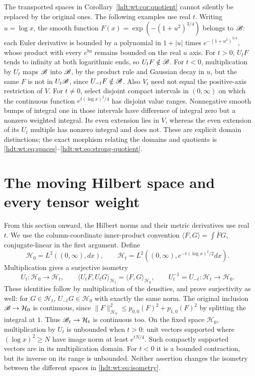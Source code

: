 The transported spaces in Corollary~\ref{hdt:wt:cor:quotient} cannot silently be
replaced by the original ones.  The following examples use real
$t$.  Writing $u=\log x$,
the smooth function
$F(x)=\exp(-(1+u^2)^{3/4})$ belongs to $\mathscr B$: each Euler
derivative is bounded by a polynomial in $1+|u|$ times
$e^{-(1+u^2)^{3/4}}$, whose product with every $e^{b u}$
remains bounded on the real $u$ axis.
For $t>0$, $U_tF$ tends to infinity at both logarithmic ends,
so $U_tF\notin\mathscr B$.  For $t<0$, multiplication by $U_t$ maps
$\mathscr B$ into $\mathscr B$, by the product rule and Gaussian decay in $u$,
but the same $F$ is not in $U_t\mathscr B$, since $U_{-t}F\notin\mathscr B$.
Also $V_t$ need not equal the positive-axis restriction of $V$.
For $t\ne0$, select disjoint compact intervals in $(0,\infty)$
on which the continuous function $e^{t(\log x)^2/4}$ has disjoint
value ranges.  Nonnegative smooth bumps of integral one in those
intervals have difference of integral zero but a nonzero weighted
integral.  Its even extension lies in $V$, whereas the even
extension of its $U_t$ multiple has nonzero integral and does not.
These are explicit domain distinctions; the exact morphism
relating the domains and quotients is
\eqref{hdt:wt:eq:spaces}--\eqref{hdt:wt:eq:strong-quotient}.

\section{The moving Hilbert space and every tensor weight}
\label{hdt:wt:sec:Hilbert}

From this section onward, the Hilbert norms and their metric
derivatives use real $t$.  We use the column-coordinate inner-product convention
$\langle F,G\rangle=\int\overline F G$, conjugate-linear in
the first argument.  Define
\begin{equation}\label{hdt:wt:eq:Hilbert}
 \mathcal H_0=L^2((0,\infty),dx),\qquad
 \mathcal H_t=L^2((0,\infty),e^{-t(\log x)^2/2}dx).
\end{equation}
Multiplication gives a surjective isometry
\begin{equation}\label{hdt:wt:eq:isometry}
 U_t:\mathcal H_0\longrightarrow \mathcal H_t,\qquad
 \langle U_tF,U_tG\rangle_{\mathcal H_t}=\langle F,G\rangle_{\mathcal H_0},
 \qquad U_t^{-1}=U_{-t}:\mathcal H_t\longrightarrow \mathcal H_0.
\end{equation}
These identities follow by multiplication of the densities,
and prove surjectivity as well: for $G\in \mathcal H_t$, $U_{-t}G\in \mathcal H_0$
with exactly the same norm.  The original inclusion $\mathscr B\to \mathcal H_0$
is continuous, since
$\|F\|_{\mathcal H_0}^2\leq p_{0,0}(F)^2+p_{1,0}(F)^2$ by splitting
the integral at $1$.  Thus $\mathscr B_t\to \mathcal H_t$ is continuous too.
On the fixed space $\mathcal H_0$, multiplication by $U_t$ is unbounded
when $t>0$: unit vectors supported where $(\log x)^2\geq N$
have image norm at least $e^{tN/4}$.  Such compactly supported
vectors are in its multiplication domain.  For $t<0$ it is a
bounded contraction, but its inverse on its range is unbounded.
Neither assertion changes the isometry between the different
spaces in \eqref{hdt:wt:eq:isometry}.

